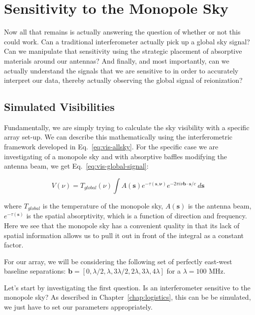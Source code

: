 \chapter{Sensitivity to the Monopole Sky}

Now all that remains is actually answering the question of whether or not this 
could work.  Can a traditional interferometer actually pick up a global sky 
signal?  Can we manipulate that sensitivity using the strategic placement of 
absorptive materials around our antennas? And finally, and most importantly, 
can we actually understand the signals that we are sensitive to in order to 
accurately interpret our data, thereby actually observing the global signal of 
reionization?

\section{Simulated Visibilities}

Fundamentally, we are simply trying to calculate the sky visibility with a 
specific array set-up. We can describe this mathematically using the 
interferometric framework developed in Eq.~\eqref{eq:vis-allsky}. For the 
specific case we are investigating of a monopole sky and with absorptive 
baffles modifying the antenna beam, we get Eq.~\eqref{eq:vis-global-signal}:

\begin{equation}
 V(\nu) = T_{global}(\nu) \int A(\mathbf{s}) e^{-\tau(\mathbf{s,\nu})} e^{-2\pi 
 i \nu \mathbf{b}\cdot\mathbf{s}/c} ~d\mathbf{s}
    \label{eq:vis-global-signal}
\end{equation}

where $T_{global}$ is the temperature of the monopole sky, $A(\mathbf{s})$ is 
the antenna beam, $e^{-\tau(\mathbf{s})}$ is the spatial absorptivity, which is 
a function of direction and frequency. Here we see that the monopole sky has a 
convenient quality in that its lack of spatial information allows us to pull it 
out in front of the integral as a constant factor.

For our array, we will be considering the following set of perfectly east-west 
baseline separations: $\mathbf{b} = [0, \lambda/2, \lambda, 3\lambda/2, 
2\lambda, 3\lambda, 4\lambda]$ for a $\lambda = 100$ MHz.

Let's start by investigating the first question. Is an interferometer sensitive 
to the monopole sky? As described in Chapter~\ref{chap:logistics}, this can be 
be simulated, we just have to set our parameters appropriately.


